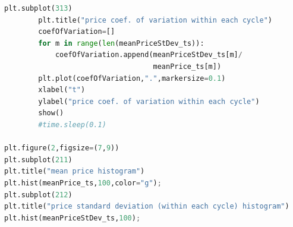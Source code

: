 \documentclass[12pt]{report}
\begin{document}
\begin{lstlisting}[language=Python, caption=Warming up of the model, basicstyle=\ttfamily\footnotesize]
        plt.subplot(313)
        plt.title("price coef. of variation within each cycle")
        coefOfVariation=[]
        for m in range(len(meanPriceStDev_ts)):
            coefOfVariation.append(meanPriceStDev_ts[m]/
                                   meanPrice_ts[m])
        plt.plot(coefOfVariation,".",markersize=0.1)
        xlabel("t")
        ylabel("price coef. of variation within each cycle")
        show()
        #time.sleep(0.1)

plt.figure(2,figsize=(7,9))
plt.subplot(211)
plt.title("mean price histogram")
plt.hist(meanPrice_ts,100,color="g");
plt.subplot(212)
plt.title("price standard deviation (within each cycle) histogram")
plt.hist(meanPriceStDev_ts,100);
\end{lstlisting}


\clearpage
{}




\clearpage
{}
\printindex
\end{document}
